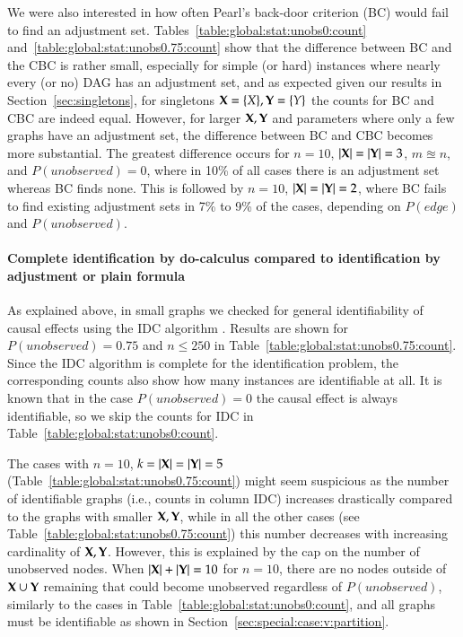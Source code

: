 We were also interested in how often Pearl's back-door criterion 
(BC) would fail to find an adjustment set.
Tables~\ref{table:global:stat:unobs0:count} 
and~\ref{table:global:stat:unobs0.75:count} show that the difference 
between BC and the CBC is rather small, especially for simple 
(or hard) instances where nearly every (or no) DAG has an adjustment set, 
and as expected given our results in Section~\ref{sec:singletons}, for singletons 
${\bf X} = \{X\}, {\bf Y}= \{Y\}$ the counts for BC and CBC are indeed equal.
However, for larger ${\bf X}, {\bf Y}$ and parameters where only 
a few graphs have an adjustment set, the difference between BC and CBC becomes
more substantial. The 
greatest difference occurs for 
$n = 10$, $|{\bf X}| = |{\bf Y}| = 3$, $m \approxeq n$, and  $P(\textit{unobserved}) = 0$,
where in 10\% of all cases there is an adjustment set whereas BC finds none. 
This is followed by $n = 10$, $|{\bf X}| = |{\bf Y}| = 2$, where BC fails to find 
existing adjustment sets in 7\% to 9\% of the cases, depending on $ P(\textit{edge})$
and $P(\textit{unobserved})$.

%
%

%
%
%
%
%
%

%
%

\paragraph{Complete identification by do-calculus compared 
to identification by adjustment or plain formula}
%
As explained above, in small graphs we checked for general identifiability 
of causal effects using the IDC algorithm \cite{ShpitserIDCAlgorithm}. 
Results are shown for $P(\textit{unobserved}) = 0.75$  and $ n \leq 250 $ in 
Table~\ref{table:global:stat:unobs0.75:count}. 
%
Since the IDC algorithm is complete for the identification problem,
the corresponding counts also show how many instances are identifiable 
at all. It is known that in the case $ P(\textit{unobserved}) = 0$ 
the causal effect is always identifiable, so we skip the counts for IDC 
in Table~\ref{table:global:stat:unobs0:count}.

The cases with $ n=10$, $k=|{\bf X}|=|{\bf Y}| = 5$ (Table~\ref{table:global:stat:unobs0.75:count}) 
might seem suspicious as   
the number of identifiable graphs (i.e., counts in column IDC) increases drastically compared to the 
graphs with smaller $ {\bf X}, {\bf Y} $, while in all the other cases (see Table~\ref{table:global:stat:unobs0.75:count})
this number decreases with increasing cardinality of $ {\bf X}, {\bf Y} $. 
However, this is explained by the cap on the number of unobserved nodes. 
When $|{\bf X}|+|{\bf Y}|=10$ for $ n=10 $, there are no nodes outside of $ {\bf X}\cup{\bf Y}$ 
remaining that could become unobserved regardless of $P(\textit{unobserved})$,
similarly to the cases in Table~\ref{table:global:stat:unobs0:count}, and all 
graphs must be identifiable as shown in Section~\ref{sec:special:case:v:partition}. 


